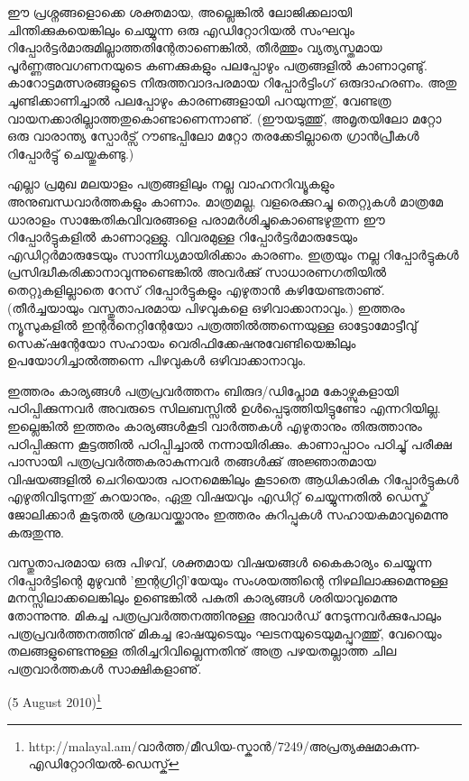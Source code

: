 ഈ പ്രശ്നങ്ങളൊക്കെ ശക്തമായ, അല്ലെങ്കില്‍ ലോജിക്കലായി ചിന്തിക്കുകയെങ്കിലും ചെയ്യുന്ന ഒരു എഡിറ്റോറിയല്‍ 
സംഘവും റിപ്പോര്‍ട്ടര്‍മാരുമില്ലാത്തതിന്റേതാണെങ്കില്‍, തീര്‍ത്തും വ്യത്യസ്തമായ പൂര്‍ണ്ണഅവഗണനയുടെ കണക്കുകളും 
പലപ്പോഴും പത്രങ്ങളില്‍ കാണാറുണ്ടു്. കാറോട്ടമത്സരങ്ങളുടെ നിരുത്തവാദപരമായ റിപ്പോര്‍ട്ടിംഗ് ഒരുദാഹരണം. അതു 
ചൂണ്ടിക്കാണിച്ചാല്‍ പലപ്പോഴും കാരണങ്ങളായി പറയുന്നതു്, വേണ്ടത്ര വായനക്കാരില്ലാത്തതുകൊണ്ടാണെന്നാണു്. 
(ഈയടുത്തു്, അമൃതയിലോ മറ്റോ ഒരു വാരാന്ത്യ സ്പോര്‍ട്സ് റൗണ്ടപ്പിലോ മറ്റോ തരക്കേടില്ലാതെ ഗ്രാന്‍പ്രീകള്‍ 
റിപ്പോര്‍ട്ടു് ചെയ്തുകണ്ടു.)

എല്ലാ പ്രമുഖ മലയാളം പത്രങ്ങളിലും നല്ല വാഹനറിവ്യൂകളും അനുബന്ധവാര്‍ത്തകളും കാണാം. മാത്രമല്ല, വളരെക്കുറച്ചു 
തെറ്റുകള്‍ മാത്രമേ ധാരാളം സാങ്കേതികവിവരങ്ങളെ പരാമര്‍ശിച്ചുകൊണ്ടെഴുതുന്ന ഈ റിപ്പോര്‍ട്ടുകളില്‍ കാണാറുള്ളു. 
വിവരമുള്ള റിപ്പോര്‍ട്ടര്‍മാരുടേയും എഡിറ്റര്‍മാരുടേയും സാന്നിധ്യമായിരിക്കാം കാരണം. ഇത്രയും നല്ല റിപ്പോര്‍ട്ടുകള്‍ 
പ്രസിദ്ധീകരിക്കാനാവുന്നുണ്ടെങ്കില്‍ അവര്‍ക്കു് സാധാരണഗതിയില്‍ തെറ്റുകളില്ലാതെ റേസ് റിപ്പോര്‍ട്ടുകളും എഴുതാന്‍ 
കഴിയേണ്ടതാണു്. (തീര്‍ച്ചയായും വസ്തുതാപരമായ പിഴവുകളെ ഒഴിവാക്കാനാവും.) ഇത്തരം ന്യൂസുകളില്‍ ഇന്റര്‍നെറ്റിന്റേയോ പത്രത്തില്‍ത്തന്നെയുള്ള 
ഓട്ടോമോട്ടീവു് സെക്‌ഷന്റേയോ സഹായം വെരിഫിക്കേഷനുവേണ്ടിയെങ്കിലും ഉപയോഗിച്ചാല്‍ത്തന്നെ പിഴവുകള്‍ 
ഒഴിവാക്കാനാവും.

ഇത്തരം കാര്യങ്ങള്‍ പത്രപ്രവര്‍ത്തനം ബിരുദ/ഡിപ്ലോമ കോഴ്സുകളായി പഠിപ്പിക്കുന്നവര്‍ അവരുടെ സിലബസ്സില്‍ 
ഉള്‍പ്പെടുത്തിയിട്ടുണ്ടോ എന്നറിയില്ല. ഇല്ലെങ്കില്‍ ഇത്തരം കാര്യങ്ങള്‍കൂടി വാര്‍ത്തകള്‍ എഴുതാനും തിരുത്താനും 
പഠിപ്പിക്കുന്ന കൂട്ടത്തില്‍ പഠിപ്പിച്ചാല്‍ നന്നായിരിക്കും. കാണാപ്പാഠം പഠിച്ചു് പരീക്ഷ പാസായി പത്രപ്രവര്‍ത്തകരാകുന്നവര്‍
തങ്ങള്‍ക്കു് അജ്ഞാതമായ വിഷയങ്ങളില്‍ ചെറിയൊരു പഠനമെങ്കിലും കൂടാതെ ആധികാരിക റിപ്പോര്‍ട്ടുകള്‍ 
എഴുതിവിടുന്നതു് കുറയാനും, ഏതു വിഷയവും എഡിറ്റ് ചെയ്യുന്നതില്‍ ഡെസ്ക് ജോലിക്കാര്‍ കൂടുതല്‍ ശ്രദ്ധവയ്ക്കാനും 
ഇത്തരം കുറിപ്പുകള്‍ സഹായകമാവുമെന്നു കരുതുന്നു.

വസ്തുതാപരമായ ഒരു പിഴവ്, ശക്തമായ വിഷയങ്ങള്‍ കൈകാര്യം ചെയ്യുന്ന റിപ്പോര്‍ട്ടിന്റെ മുഴുവന്‍ 'ഇന്റഗ്രിറ്റി'യേയും 
സംശയത്തിന്റെ നിഴലിലാക്കുമെന്നുള്ള മനസ്സിലാക്കലെങ്കിലും ഉണ്ടെങ്കില്‍ പകുതി കാര്യങ്ങള്‍ ശരിയാവുമെന്നു തോന്നുന്നു. 
മികച്ച പത്രപ്രവര്‍ത്തനത്തിനുള്ള അവാര്‍ഡ് നേടുന്നവര്‍ക്കുപോലും പത്രപ്രവര്‍ത്തനത്തിനു് മികച്ച ഭാഷയുടെയും 
ഘടനയുടെയുമപ്പുറത്തു്, വേറെയും തലങ്ങളുണ്ടെന്നുള്ള തിരിച്ചറിവില്ലെന്നതിനു് അത്ര പഴയതല്ലാത്ത ചില 
പത്രവാര്‍ത്തകള്‍ സാക്ഷികളാണു്.

(5 August 2010)\footnote{http://malayal.am/വാര്‍ത്ത/മീഡിയ-സ്കാന്‍/7249/അപ്രത്യക്ഷമാകുന്ന-എഡിറ്റോറിയല്‍-ഡെസ്ക്}

\newpage
